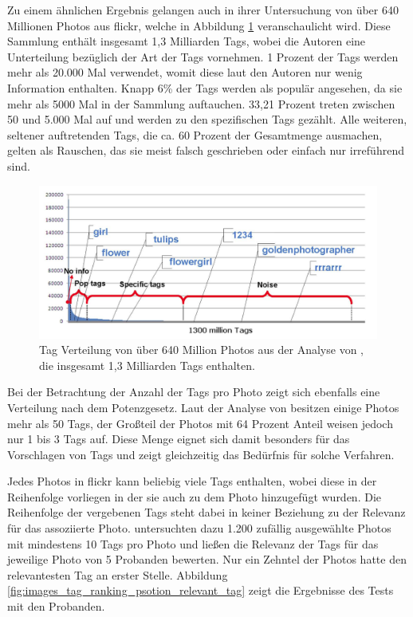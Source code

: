 Zu einem ähnlichen Ergebnis gelangen auch \cite{learningToTag} in ihrer Untersuchung von über 640 Millionen Photos aus flickr, welche in Abbildung \ref{fig:images_learning_to_tag_frequency} veranschaulicht wird. Diese Sammlung enthält insgesamt 1,3 Milliarden Tags, wobei die Autoren eine Unterteilung bezüglich der Art der Tags vornehmen. 1 Prozent der Tags werden mehr als 20.000 Mal verwendet, womit diese laut den Autoren nur wenig Information enthalten. Knapp 6\% der Tags werden als populär angesehen, da sie mehr als 5000 Mal in der Sammlung auftauchen. 33,21 Prozent treten zwischen 50 und 5.000 Mal auf und werden zu den spezifischen Tags gezählt. Alle weiteren, seltener auftretenden Tags, die ca. 60 Prozent der Gesamtmenge ausmachen, gelten als Rauschen, das sie meist falsch geschrieben oder einfach nur irreführend sind.

\begin{figure}[htbp]
    \centering
      \includegraphics[height=2in]{images/learning_to_tag_frequency.png}
    \caption{Tag Verteilung von über 640 Million Photos aus der Analyse von \cite{learningToTag}, die insgesamt 1,3 Milliarden Tags enthalten.}
    \label{fig:images_learning_to_tag_frequency}
\end{figure}


Bei der Betrachtung der Anzahl der Tags pro Photo zeigt sich ebenfalls eine Verteilung nach dem Potenzgesetz. Laut der Analyse von \cite{collectiveKnowledge} besitzen einige Photos mehr als 50 Tags, der Großteil der Photos mit 64 Prozent Anteil weisen jedoch nur 1 bis 3 Tags auf. Diese Menge eignet sich damit besonders für das Vorschlagen von Tags und zeigt gleichzeitig das Bedürfnis für solche Verfahren.

Jedes Photos in flickr kann beliebig viele Tags enthalten, wobei diese in der Reihenfolge vorliegen in der sie auch zu dem Photo hinzugefügt wurden. Die Reihenfolge der vergebenen Tags steht dabei in keiner Beziehung zu der Relevanz für das assoziierte Photo. \cite{ranking} untersuchten dazu 1.200 zufällig ausgewählte Photos mit mindestens 10 Tags pro Photo und ließen die Relevanz der Tags für das jeweilige Photo von 5 Probanden bewerten. Nur ein Zehntel der Photos hatte den relevantesten Tag an erster Stelle. Abbildung \ref{fig:images_tag_ranking_psotion_relevant_tag} zeigt die Ergebnisse des Tests mit den Probanden.

